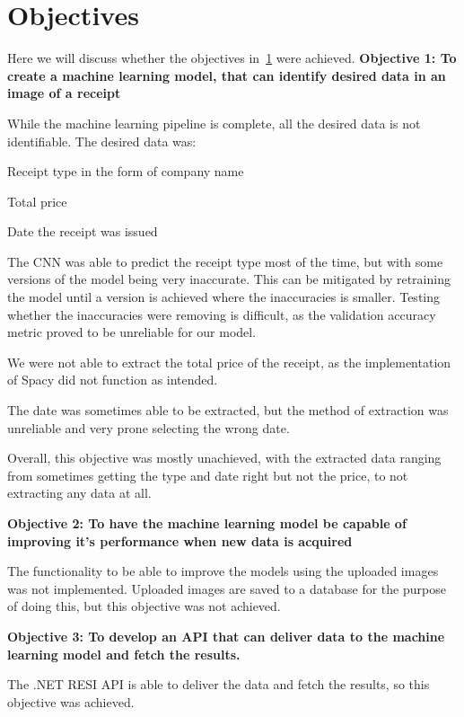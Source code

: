 \section{Objectives}\label{sec:objectives}
Here we will discuss whether the objectives in~\ref{sec:objectives} were achieved.
\textbf{Objective 1: To create a machine learning model, that can identify desired data in an image of a receipt}

While the machine learning pipeline is complete, all the desired data is not identifiable.
The desired data was:

\begin{compactitem}
    \item Receipt type in the form of company name
    \item Total price
    \item Date the receipt was issued
\end{compactitem}


The CNN was able to predict the receipt type most of the time, but with some versions of the model being very inaccurate.
This can be mitigated by retraining the model until a version is achieved where the inaccuracies is smaller.
Testing whether the inaccuracies were removing is difficult, as the validation accuracy metric proved to be unreliable for our model.

We were not able to extract the total price of the receipt, as the implementation of Spacy did not function as intended.

The date was sometimes able to be extracted, but the method of extraction was unreliable and very prone selecting the wrong date.

Overall, this objective was mostly unachieved, with the extracted data ranging from sometimes getting the type and date right but not the price, to not extracting any data at all.

\textbf{Objective 2: To have the machine learning model be capable of improving it's performance when new data is acquired}

The functionality to be able to improve the models using the uploaded images was not implemented.
Uploaded images are saved to a database for the purpose of doing this, but this objective was not achieved.

\textbf{Objective 3: To develop an API that can deliver data to the machine learning model and fetch the results.}

The .NET RESI API is able to deliver the data and fetch the results, so this objective was achieved.